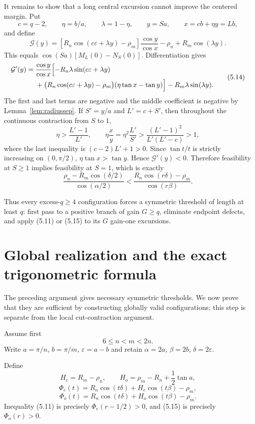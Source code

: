 \documentclass[11pt]{article}
\theoremstyle{remark}
\begin{document}
It remains to show that a long central excursion cannot improve the centered margin. Put
\[
c=q-2,\qquad \eta=b/a,\qquad \lambda=1-\eta,
\qquad y=Sa,\qquad x=cb+\eta y=Lb,
\]
and define
\[
\mathcal G(y)=
\left[R_n\cos(c\varepsilon+\lambda y)-\rho_m\right]
\frac{\cos y}{\cos x}-\rho_n+R_m\cos(\lambda y).
\tag{5.13}
\]
This equals $\cos(Sa)[M_L(0)-N_S(0)]$. Differentiation gives
\[
\begin{aligned}
\mathcal G'(y)
={}&\frac{\cos y}{\cos x}\Bigl[-R_n\lambda\sin(c\varepsilon+\lambda y)\\
&+\bigl(R_n\cos(c\varepsilon+\lambda y)-\rho_m\bigr)
(\eta\tan x-\tan y)\Bigr]
-R_m\lambda\sin(\lambda y).
\end{aligned}
\tag{5.14}
\]
The first and last terms are negative and the middle coefficient is negative by Lemma~\ref{lem:radiussep}. If $S'=y/a$ and $L'=c+S'$, then throughout the continuous contraction from $S$ to $1$,
\[
\eta>\frac{L'-1}{L'},
\qquad
\eta\frac{x}{y}=\eta^2\frac{L'}{S'}>
\frac{(L'-1)^2}{L'(L'-c)}>1,
\]
where the last inequality is $(c-2)L'+1>0$. Since $\tan t/t$ is strictly increasing on $(0,\pi/2)$, $\eta\tan x>\tan y$. Hence $\mathcal G'(y)<0$. Therefore feasibility at $S\ge1$ implies feasibility at $S=1$, which is exactly
\[
\boxed{
\frac{\rho_n-R_m\cos(\delta/2)}{\cos(\alpha/2)}<
\frac{R_n\cos(r\delta)-\rho_m}{\cos(r\beta)}.}
\tag{5.15}
\]

Thus every excess-$q\ge4$ configuration forces a symmetric threshold of length at least $q$: first pass to a positive branch of gain $G\ge q$, eliminate endpoint defects, and apply (5.11) or (5.15) to its $G$ gain-one excursions.

\section{Global realization and the exact trigonometric formula}\label{sec:centered}

The preceding argument gives necessary symmetric thresholds. We now prove that they are sufficient by constructing globally valid configurations; this step is separate from the local cut-contraction argument.

Assume first
\[
6\le n<m<2n.
\]
Write $a=\pi/n$, $b=\pi/m$, $\varepsilon=a-b$ and retain $\alpha=2a$, $\beta=2b$, $\delta=2\varepsilon$.

Define
\[
H_e=R_m-\rho_n,
\qquad
H_o=\rho_m-R_n+\frac12\tan a,
\]
\[
\Phi_e(t)=R_n\cos(t\delta)+H_e\cos(t\beta)-\rho_m,
\tag{6.1}
\]
\[
\Phi_o(t)=R_n\cos(t\delta)+H_o\cos(t\beta)-\rho_m.
\tag{6.2}
\]
Inequality (5.11) is precisely $\Phi_e(r-1/2)>0$, and (5.15) is precisely $\Phi_o(r)>0$.
\end{document}
